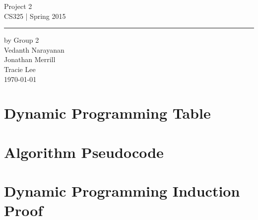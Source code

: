 \documentclass[11pt,letterpaper]{article}
\begin{document}
\begin{titlepage}
    \vspace*{4cm}
    \begin{flushright}
    {\huge
        Project 2\\[5mm]
    }
    {\large
        CS325 | Spring 2015
     }
    \end{flushright}
\hrule
    \begin{flushright}
	by Group 2\\
	Vedanth Narayanan\\
	Jonathan Merrill\\
	Tracie Lee\\
    \vfill
	\today\\
    \end{flushright}
\end{titlepage}

\raggedright

\section*{Dynamic Programming Table}

\section*{Algorithm Pseudocode}

\section*{Dynamic Programming Induction Proof}
\end{document}
